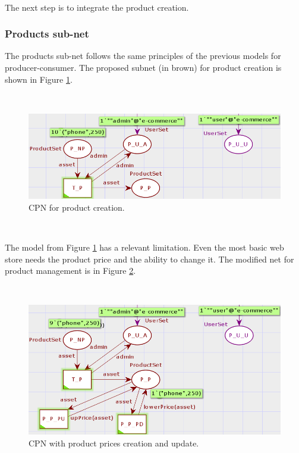 \documentclass[12pt,english]{article} %
\begin{document}
\

The next step is to integrate the product creation.


\subsubsection{Products sub-net}
The products sub-net follows the same principles of the previous models for producer-consumer.
The proposed subnet (in brown) for product creation is shown in Figure \ref{fig:mws-cpn-basic-product-initial}.

\

\begin{figure}[H]
    \centering
    \includegraphics[scale=0.65]{img/mws/cpn/mws_cpn_basic_product_initial.png}
    \caption{CPN for product creation.}
    \label{fig:mws-cpn-basic-product-initial}
\end{figure}

\


The model from Figure \ref{fig:mws-cpn-basic-product-initial} has a relevant limitation.
Even the most basic web store needs the product price and the ability to change it.
The modified net for product management is in Figure \ref{fig:mws-cpn-product-with-price-and-edit}.

\

\begin{figure}[H]
    \centering
    \includegraphics[scale=0.65]{img/mws/cpn/mws_cpn_product_created.png}
    \caption{CPN with product prices creation and update.}
    \label{fig:mws-cpn-product-with-price-and-edit}
\end{figure}
\end{document}
